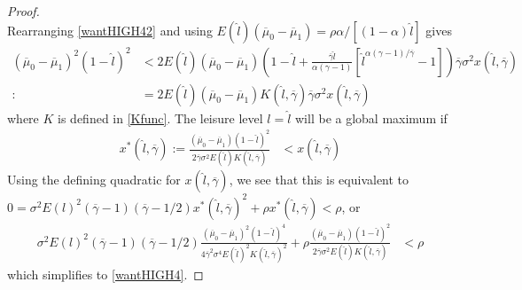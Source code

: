 \documentclass[11pt]{article}
\theoremstyle{plain}
\begin{document}
\begin{proof}
\begin{equation}
\label{wantHIGH42}
\end{equation}
Rearranging \eqref{wantHIGH42} and using $E(\hat{l})(\overline{\mu}_0 - \overline{\mu}_1) = \rho \alpha/[(1-\alpha)\hat{l}]$ gives
\begin{align*}
(\overline{\mu}_0 - \overline{\mu}_1)^2(1-\hat{l})^2 & < 2E(\hat{l})(\overline{\mu}_0 - \overline{\mu}_1){\left(1-\hat{l} + \frac{\overline{\gamma}\hat{l}}{\alpha(\gamma-1)}[\hat{l}^{\alpha(\gamma-1)/\overline{\gamma}}-1] \right)}\overline{\gamma} \sigma^2 x(\hat{l},\overline{\gamma})
\\ : & = 2E(\hat{l})(\overline{\mu}_0 - \overline{\mu}_1)K(\hat{l},\overline{\gamma}) \overline{\gamma}\sigma^2 x(\hat{l},\overline{\gamma})
\end{align*}
where $K$ is defined in \eqref{Kfunc}. The leisure level $l=\hat{l}$ will be a global maximum if 
\begin{align*}
x^*(\hat{l},\overline{\gamma}) := \frac{(\overline{\mu}_0 - \overline{\mu}_1)(1-\hat{l})^2}{2\overline{\gamma} \sigma^2E(\hat{l})K(\hat{l},\overline{\gamma})} & <  x(\hat{l},\overline{\gamma})
\end{align*}
Using the defining quadratic for $x(\hat{l},\overline{\gamma})$, we see that this is equivalent to $0 = \sigma^2E(l)^2(\overline{\gamma}-1)(\overline{\gamma}-1/2)x^*(\hat{l},\overline{\gamma})^2 + \rho x^*(\hat{l},\overline{\gamma}) < \rho$, or
\begin{align*}
\sigma^2E(l)^2(\overline{\gamma}-1)(\overline{\gamma}-1/2)\frac{(\overline{\mu}_0 - \overline{\mu}_1)^2(1-\hat{l})^4}{4\overline{\gamma}^2 \sigma^4E(\hat{l})^2K(\hat{l},\overline{\gamma})^2} + \rho \frac{(\overline{\mu}_0 - \overline{\mu}_1)(1-\hat{l})^2}{2\overline{\gamma} \sigma^2E(\hat{l})K(\hat{l},\overline{\gamma})} & <  \rho 
\end{align*}
which simplifies to \eqref{wantHIGH4}. 
\end{proof}
\end{document}
